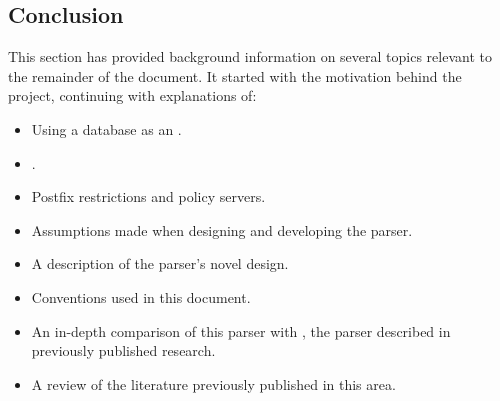 %

\subsection{Conclusion}

This section has provided background information on several topics relevant
to the remainder of the document.  It started with the motivation behind
the project, continuing with explanations of:

\begin{itemize}

    \item Using a database as an \API{}.

    \item \SMTP{}.

    \item Postfix restrictions and policy servers.

    \item Assumptions made when designing and developing the parser.

    \item A description of the parser's novel design.

    \item Conventions used in this document.

    \item An in-depth comparison of this parser with \LMA{}, the parser
        described in previously published research.

    \item A review of the literature previously published in this area.

\end{itemize}

